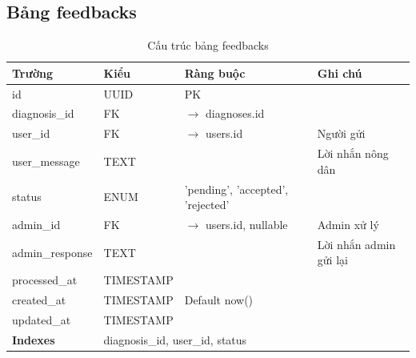 \documentclass[12pt,a4paper]{article}
\begin{document}
\subsection{Bảng feedbacks}
\clearpage
\begin{table}[htbp]
    \centering
    \small
    \renewcommand{\arraystretch}{0.95}
    \setlength{\tabcolsep}{5pt}
    \caption{Cấu trúc bảng feedbacks}
    \begin{tabular}{|l|l|l|p{5.5cm}|}
        \hline
        \rowcolor{headerblue}
        \textbf{Trường}  & \textbf{Kiểu}                                        & \textbf{Ràng buộc}                & \textbf{Ghi chú}       \\
        \hline
        id               & UUID                                                 & PK                                &                        \\
        \hline
        diagnosis\_id    & FK                                                   & $\rightarrow$ diagnoses.id        &                        \\
        \hline
        user\_id         & FK                                                   & $\rightarrow$ users.id            & Người gửi              \\
        \hline
        user\_message    & TEXT                                                 &                                   & Lời nhắn nông dân      \\
        \hline
        status           & ENUM                                                 & 'pending', 'accepted', 'rejected' &                        \\
        \hline
        admin\_id        & FK                                                   & $\rightarrow$ users.id, nullable  & Admin xử lý            \\
        \hline
        admin\_response  & TEXT                                                 &                                   & Lời nhắn admin gửi lại \\
        \hline
        processed\_at    & TIMESTAMP                                            &                                   &                        \\
        \hline
        created\_at      & TIMESTAMP                                            & Default now()                     &                        \\
        \hline
        updated\_at      & TIMESTAMP                                            &                                   &                        \\
        \hline
        \rowcolor{headerblue}
        \textbf{Indexes} & \multicolumn{3}{l|}{diagnosis\_id, user\_id, status}                                                              \\
        \hline
    \end{tabular}
\end{table}
\end{document}
